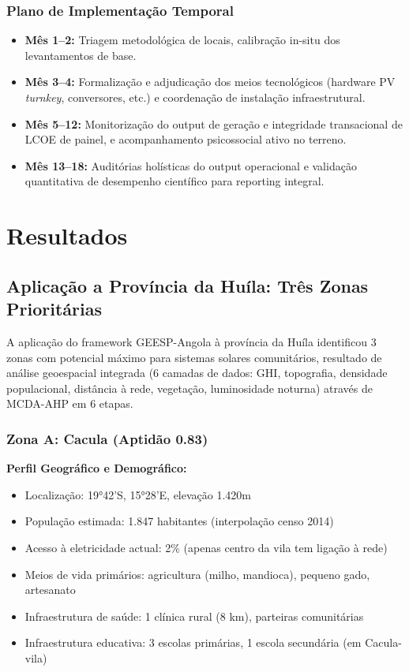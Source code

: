 \documentclass[12pt, a4paper]{article}
\begin{document}
\subsubsection{Plano de Implementação Temporal}
\begin{itemize}
  \item \textbf{Mês 1–2:} Triagem metodológica de locais, calibração in-situ dos levantamentos de base.
  \item \textbf{Mês 3–4:} Formalização e adjudicação dos meios tecnológicos (hardware PV \textit{turnkey}, conversores, etc.) e coordenação de instalação infraestrutural.
  \item \textbf{Mês 5–12:} Monitorização do output de geração e integridade transacional de LCOE de painel, e acompanhamento psicossocial ativo no terreno.
  \item \textbf{Mês 13–18:} Auditórias holísticas do output operacional e validação quantitativa de desempenho científico para reporting integral.
\end{itemize}


\section{Resultados}

\subsection{Aplicação a Província da Huíla: Três Zonas Prioritárias}

A aplicação do framework GEESP-Angola à província da Huíla identificou 3 zonas com potencial máximo para sistemas solares comunitários, resultado de análise geoespacial integrada (6 camadas de dados: GHI, topografia, densidade populacional, distância à rede, vegetação, luminosidade noturna) através de MCDA-AHP em 6 etapas.

\subsubsection{Zona A: Cacula (Aptidão 0.83)}

\textbf{Perfil Geográfico e Demográfico:}
\begin{itemize}
\item Localização: 19°42'S, 15°28'E, elevação 1.420m
\item População estimada: 1.847 habitantes (interpolação censo 2014)
\item Acesso à eletricidade actual: 2\% (apenas centro da vila tem ligação à rede)
\item Meios de vida primários: agricultura (milho, mandioca), pequeno gado, artesanato
\item Infraestrutura de saúde: 1 clínica rural (8 km), parteiras comunitárias
\item Infraestrutura educativa: 3 escolas primárias, 1 escola secundária (em Cacula-vila)
\end{itemize}
\end{document}

